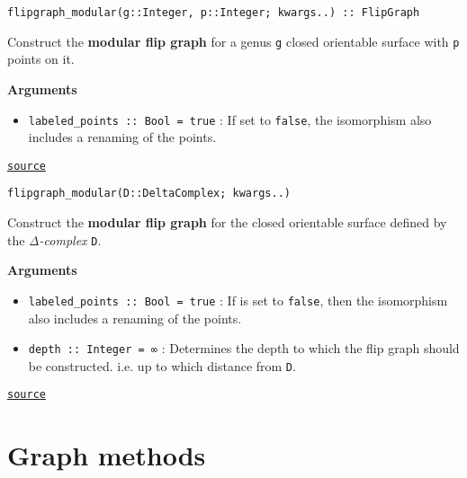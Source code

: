 \begin{adjustwidth}{2em}{0pt}


\begin{verbatim}
flipgraph_modular(g::Integer, p::Integer; kwargs..) :: FlipGraph
\end{verbatim}

Construct the \textbf{modular flip graph} for a genus \texttt{g} closed orientable surface with \texttt{p} points on it.  

\textbf{Arguments}

\begin{itemize}
\item \texttt{labeled\_points :: Bool = true} : If set to \texttt{false}, the isomorphism also includes a renaming of the points. 

\end{itemize}


\href{https://github.com/schto223/FlipGraphs.jl/blob/490c01a7adf74b42f27dda05099165c47ae8133e/src/flipGraph.jl#L284-L291}{\texttt{source}}



\begin{verbatim}
flipgraph_modular(D::DeltaComplex; kwargs..)
\end{verbatim}

Construct the \textbf{modular flip graph} for the closed orientable surface defined by the \emph{Δ-complex} \texttt{D}.  

\textbf{Arguments}

\begin{itemize}
\item \texttt{labeled\_points :: Bool = true} : If is set to \texttt{false}, then the isomorphism also includes a renaming of the points. 


\item \texttt{depth :: Integer = ∞} : Determines the depth to which the flip graph should be constructed. i.e. up to which distance from \texttt{D}. 

\end{itemize}


\href{https://github.com/schto223/FlipGraphs.jl/blob/490c01a7adf74b42f27dda05099165c47ae8133e/src/flipGraph.jl#L296-L304}{\texttt{source}}


\end{adjustwidth}

\section{Graph methods}



